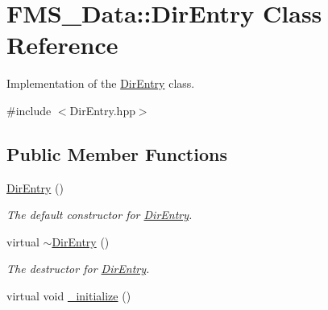 \hypertarget{classFMS__Data_1_1DirEntry}{
\section{FMS\_\-Data::DirEntry Class Reference}
\label{classFMS__Data_1_1DirEntry}
}


Implementation of the \hyperlink{classFMS__Data_1_1DirEntry}{DirEntry} class.  




{\ttfamily \#include $<$DirEntry.hpp$>$}

\subsection*{Public Member Functions}
\begin{DoxyCompactItemize}
\item 
\hypertarget{classFMS__Data_1_1DirEntry_a82d8b0f96ba4f5d09ee92660d97e6203}{
\hyperlink{classFMS__Data_1_1DirEntry_a82d8b0f96ba4f5d09ee92660d97e6203}{DirEntry} ()}
\label{classFMS__Data_1_1DirEntry_a82d8b0f96ba4f5d09ee92660d97e6203}

\begin{DoxyCompactList}\small\item\em The default constructor for \hyperlink{classFMS__Data_1_1DirEntry}{DirEntry}. \item\end{DoxyCompactList}\item 
\hypertarget{classFMS__Data_1_1DirEntry_a8026c6fcfe862cbfd737ff4bdd26d56d}{
virtual \hyperlink{classFMS__Data_1_1DirEntry_a8026c6fcfe862cbfd737ff4bdd26d56d}{$\sim$DirEntry} ()}
\label{classFMS__Data_1_1DirEntry_a8026c6fcfe862cbfd737ff4bdd26d56d}

\begin{DoxyCompactList}\small\item\em The destructor for \hyperlink{classFMS__Data_1_1DirEntry}{DirEntry}. \item\end{DoxyCompactList}\item 
\hypertarget{classFMS__Data_1_1DirEntry_a7f69e6987cb2880d4e302bc148974e84}{
virtual void \hyperlink{classFMS__Data_1_1DirEntry_a7f69e6987cb2880d4e302bc148974e84}{\_\-initialize} ()}
\label{classFMS__Data_1_1DirEntry_a7f69e6987cb2880d4e302bc148974e84}


\end{DoxyCompactItemize}
